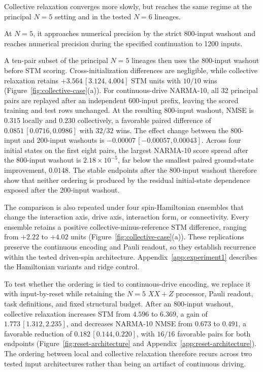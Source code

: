 Collective relaxation
converges more slowly, but reaches the same regime at the principal \(N=5\)
setting and in the tested \(N=6\) lineages.

At \(N=5\), it approaches numerical
precision by the strict 800-input washout and reaches numerical precision
during the specified continuation to 1200 inputs.

A ten-pair subset of the principal \(N=5\) lineages then uses the 800-input
washout before STM scoring. Cross-initialization differences are negligible,
while collective relaxation retains \(+3.564\,[3.124,4.004]\) STM units with
\(10/10\) wins (Figure~\ref{fig:collective-case}(a)). For continuous-drive
NARMA-10, all 32 principal pairs are replayed after an independent 600-input
prefix, leaving the scored training and test rows unchanged. At the resulting
800-input washout, NMSE is \(0.315\) locally and \(0.230\) collectively, a
favorable paired difference of \(0.0851\,[0.0716,0.0986]\) with \(32/32\)
wins. The effect change between the 800-input and 200-input washouts is
\(-0.00007\,[-0.00057,0.00043]\). Across four initial states on the first eight
pairs, the largest NARMA-10 score spread after the 800-input washout is
\(2.18\times10^{-5}\), far
below the smallest paired ground-state improvement, \(0.0148\). The stable
endpoints after the 800-input washout therefore show that neither ordering is produced
by the residual initial-state dependence exposed after the 200-input washout.

The comparison is also repeated under four spin-Hamiltonian ensembles that
change the interaction axis, drive axis, interaction form, or connectivity.
Every ensemble retains a positive collective-minus-reference STM difference,
ranging from \(+2.22\) to \(+4.02\) units
(Figure~\ref{fig:collective-case}(a)). These replications preserve the continuous
encoding and Pauli readout, so they establish recurrence within the tested
driven-spin architecture. Appendix~\ref{app:experiment1} describes the
Hamiltonian variants and ridge control.

To test whether the ordering is tied to continuous-drive encoding, we replace
it with input-by-reset while retaining the \(N=5\) \(XX+Z\) processor, Pauli
readout, task definitions, and fixed structural budget. After an 800-input
washout, collective relaxation increases STM from \(4.596\) to \(6.369\), a
gain of \(1.773\,[1.312,2.235]\), and decreases NARMA-10 NMSE from \(0.673\)
to \(0.491\), a favorable reduction of \(0.182\,[0.144,0.220]\), with \(16/16\)
favorable pairs for both endpoints
(Figure~\ref{fig:reset-architecture} and
Appendix~\ref{app:reset-architecture}). The ordering between local and
collective relaxation therefore recurs across two tested input architectures rather than being an
artifact of continuous driving.

